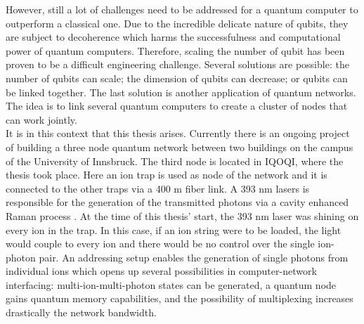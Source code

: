 \documentclass[english, a4paper, 12pt, twoside]{book}
\numberwithin{equation}{section} %
\begin{document}
However, still a lot of challenges need to be addressed for a quantum computer to outperform a classical one. Due to the incredible delicate nature of qubits, they are subject to decoherence which harms the successfulness and computational power of quantum computers. Therefore, scaling the number of qubit has been proven to be a difficult engineering challenge. Several solutions are possible: the number of qubits can scale; the dimension of qubits can decrease; or qubits can be linked together. The last solution is another application of quantum networks. The idea is to link several quantum computers to create a cluster of nodes that can work jointly.\\
It is in this context that this thesis arises. Currently there is an ongoing project of building a three node quantum network between two buildings on the campus of the University of Innsbruck. The third node is located in IQOQI, where the thesis took place. Here an ion trap is used as node of the network and it is connected to the other traps via a 400 m fiber link. A 393 nm lasers is responsible for the generation of the transmitted photons via a cavity enhanced Raman process \cite{stuteinterface}. At the time of this thesis' start, the 393 nm laser was shining on every ion in the trap. In this case, if an ion string were to be loaded, the light would couple to every ion and there would be no control over the single ion-photon pair. An addressing setup enables the generation of single photons from individual ions which opens up several possibilities in computer-network interfacing: multi-ion-multi-photon states can be generated, a quantum node gains quantum memory capabilities, and the possibility of multiplexing increases drastically the network bandwidth.
\end{document}
